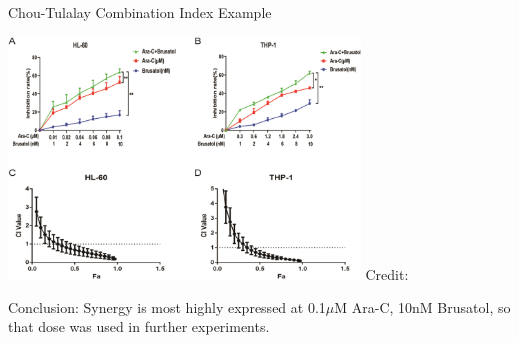\documentclass{beamer}
\begin{document}
\begin{frame}{Chou-Tulalay Combination Index Example}
    \begin{center}
        \includegraphics[width = 0.7\textwidth]{figs/ci-example.jpg}
        \hspace*{15pt}\hbox{\scriptsize Credit:}
    \end{center}
    Conclusion: Synergy is most highly expressed at 0.1$\mu$M Ara-C, 10nM Brusatol, so that dose was used in further experiments.
\end{frame}
\end{document}
